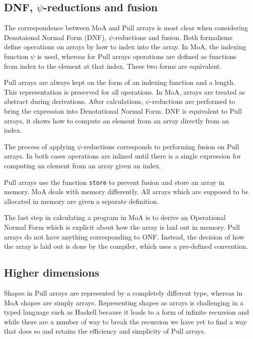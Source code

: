 \documentclass{sigplanconf}
\begin{document}
\subsection{DNF, \(\psi\)-reductions and fusion}
\label{sec:normalization}

The correspondence between MoA and Pull arrays is most clear when
considering Denotaional Normal Form (DNF), \(\psi\)-reductions and
fusion. Both formalisms define operations on arrays by how to index
into the array. In MoA, the indexing function \(\psi\) is used,
whereas for Pull arrays operations are defined as functions from index
to the element at that index. These two forms are equivalent.

Pull arrays are always kept on the form of an indexing function and a
length. This representation is preserved for all operations. In MoA,
arrays are treated as abstract during derivations. After calculations,
\(\psi\)-reductions are performed to bring the expression into
Denotational Normal Form. DNF is equivalent to Pull arrays, it shows
how to compute an element from an array directly from an index.

The process of applying \(\psi\)-reductions corresponds to performing
fusion on Pull arrays. In both cases operations are inlined until
there is a single expression for computing an element from an array
given an index.

Pull arrays use the function \verb!store! to prevent fusion and store
an array in memory. MoA deals with memory differently. All arrays
which are supposed to be allocated in memory are given a separate
definition.

The last step in calculating a program in MoA is to derive an
Operational Normal Form which is explicit about how the array is laid
out in memory. Pull arrays do not have anything corresponding to
ONF. Instead, the decision of how the array is laid out is done by the
compiler, which uses a pre-defined convention.

\subsection{Higher dimensions}
\label{sec:highdim}

Shapes in Pull arrays are represented by a completely different type,
whereas in MoA shapes are simply arrays. Representing shapes as arrays
is challenging in a typed language such as Haskell because it leads to
a form of infinite recursion and while there are a number of way to
break the recursion we have yet to find a way that does so and retains
the efficiency and simplicity of Pull arrays.
\end{document}
